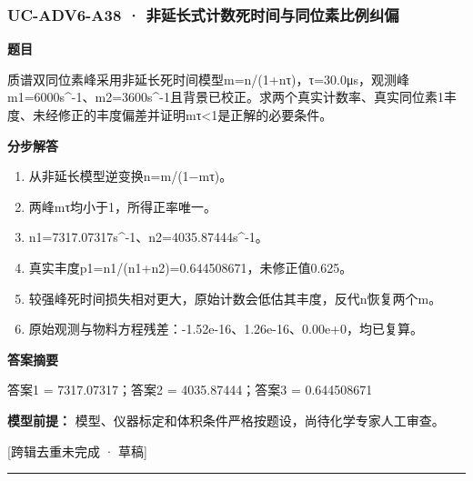 \documentclass[UTF8,11pt,a4paper]{ctexart}
\begin{document}
\subsubsection*{UC-ADV6-A38 · 非延长式计数死时间与同位素比例纠偏}
\noindent\textbf{题目}\par
质谱双同位素峰采用非延长死时间模型m=n/(1+nτ)，τ=30.0μs，观测峰m1=6000s\textasciicircum{}-1、m2=3600s\textasciicircum{}-1且背景已校正。求两个真实计数率、真实同位素1丰度、未经修正的丰度偏差并证明mτ<1是正解的必要条件。\par
\medskip\noindent\textbf{分步解答}
\begin{enumerate}
\item 从非延长模型逆变换n=m/(1−mτ)。
\item 两峰mτ均小于1，所得正率唯一。
\item n1=7317.07317s\textasciicircum{}-1、n2=4035.87444s\textasciicircum{}-1。
\item 真实丰度p1=n1/(n1+n2)=0.644508671，未修正值0.625。
\item 较强峰死时间损失相对更大，原始计数会低估其丰度，反代n恢复两个m。
\item 原始观测与物料方程残差：-1.52e-16、1.26e-16、0.00e+0，均已复算。
\end{enumerate}
\noindent\textbf{答案摘要}\par
答案1 = 7317.07317；答案2 = 4035.87444；答案3 = 0.644508671\par
\noindent\textbf{模型前提：}
模型、仪器标定和体积条件严格按题设，尚待化学专家人工审查。\par
\noindent\textcolor{red!65!black}{[跨辑去重未完成 · 草稿]} \par
\medskip\hrule\medskip
{}
\end{document}
